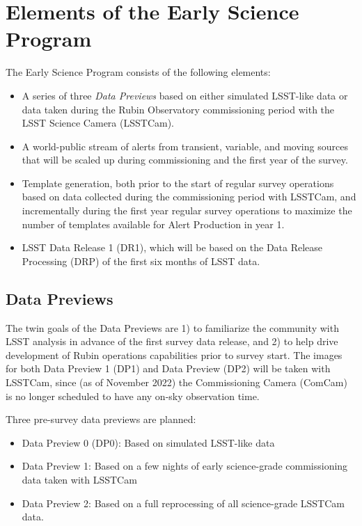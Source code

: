 \section{Elements of the Early Science Program}

The Early Science Program consists of the following elements:
\begin{itemize}
	\item A series of three \emph{Data Previews} based on either simulated LSST-like data or data taken during the Rubin Observatory commissioning period with the LSST Science Camera (LSSTCam).
	\item A world-public stream of alerts from transient, variable, and moving sources that will be scaled up during commissioning and the first year of the survey.
	\item Template generation, both prior to the start of regular survey operations based on data collected during the commissioning period with LSSTCam, and incrementally during the first year regular survey operations  to maximize the number of templates available for Alert Production in year 1.
	\item LSST Data Release 1 (DR1), which will be based on the Data Release Processing (DRP) of the first six months of LSST data.
\end{itemize}

\subsection{Data Previews}

The twin goals of the Data Previews are 1) to familiarize the community with LSST analysis in advance of the first survey data release, and 2) to help drive development of Rubin operations capabilities prior to survey start.
The images for both Data Preview 1 (DP1) and Data Preview (DP2) will be taken with LSSTCam, since (as of November 2022) the Commissioning Camera (ComCam) is no longer scheduled to have any on-sky observation time.

Three pre-survey data previews are planned:
\begin{itemize}
\item  Data Preview 0 (DP0): Based on simulated LSST-like data
\item  Data Preview 1: Based on a few nights of early science-grade commissioning data taken with LSSTCam
\item Data Preview 2: Based on a full reprocessing of all science-grade LSSTCam data.

\end{itemize}

